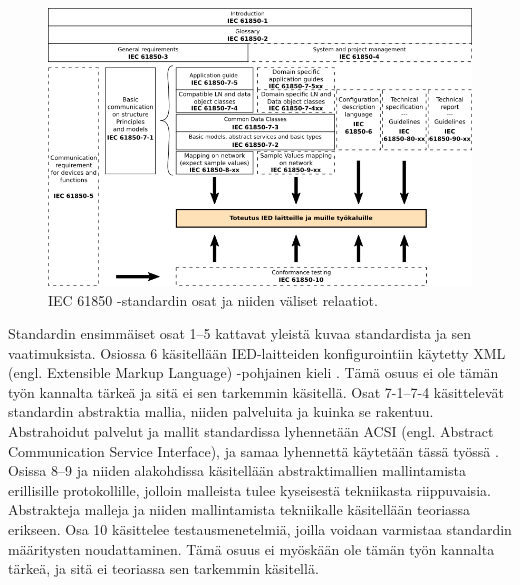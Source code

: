 \begin{figure}
	\includegraphics[width=1\textwidth]{pictures/iec61850-series-parts-and-relations.png}
	\caption{IEC 61850 -standardin osat ja niiden väliset relaatiot.}
	\label{fig:iec61850-osat-ja-relaatiot}
\end{figure}

Standardin ensimmäiset osat 1--5 kattavat yleistä kuvaa standardista ja sen vaatimuksista. Osiossa 6 käsitellään IED-laitteiden konfigurointiin käytetty XML (engl. Extensible Markup Language) -pohjainen kieli \cite[s.~7--8]{IEC61850-6}. Tämä osuus ei ole tämän työn kannalta tärkeä ja sitä ei sen tarkemmin käsitellä. Osat 7-1--7-4 käsittelevät standardin abstraktia mallia, niiden palveluita ja kuinka se rakentuu. Abstrahoidut palvelut ja mallit standardissa lyhennetään ACSI (engl. Abstract Communication Service Interface), ja samaa lyhennettä käytetään tässä työssä \cite[s.~72]{IEC61850-7-1}. Osissa 8--9 ja niiden alakohdissa käsitellään abstraktimallien mallintamista erillisille protokollille, jolloin malleista tulee kyseisestä tekniikasta riippuvaisia. Abstrakteja malleja ja niiden mallintamista tekniikalle käsitellään teoriassa erikseen. Osa 10 käsittelee testausmenetelmiä, joilla voidaan varmistaa standardin määritysten noudattaminen. Tämä osuus ei myöskään ole tämän työn kannalta tärkeä, ja sitä ei teoriassa sen tarkemmin käsitellä. \cite[s.~15]{IEC61850-7-1}


